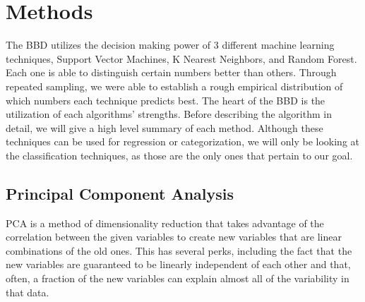 \documentclass[11pt, oneside]{article}   	%
\begin{document}
\section{Methods}
The BBD utilizes the decision making power of 3 different machine learning techniques, Support Vector Machines, K Nearest Neighbors, and Random Forest. Each one is able to distinguish certain numbers better than others. Through repeated sampling, we were able to establish a rough empirical distribution of which numbers each technique predicts best. The heart of the BBD is the utilization of each algorithms' strengths. Before describing the algorithm in detail, we will give a high level summary of each method. Although these techniques can be used for regression or categorization, we will only be looking at the classification techniques, as those are the only ones that pertain to our goal.

\subsection{Principal Component Analysis}
PCA is a method of dimensionality reduction that takes advantage of the correlation between the given variables to create new variables that are linear combinations of the old ones. This has several perks, including the fact that the new variables are guaranteed to be linearly independent of each other and that, often, a fraction of the new variables can explain almost all of the variability in that data. \cite{PCABook}
\end{document}
